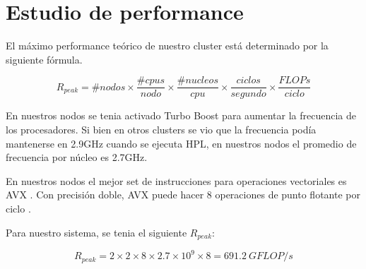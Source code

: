 
\section{Estudio de performance}

El máximo performance teórico de nuestro cluster está determinado por la siguiente fórmula. 

\begin{equation} \label{eq:1}
	R_{peak} = \#nodos \times \frac{\#cpus}{nodo} \times \frac{\#nucleos}{cpu} \times \frac{ciclos}{segundo} \times \frac{FLOPs}{ciclo} 
\end{equation}

En nuestros nodos se tenia activado Turbo Boost para aumentar la frecuencia de los procesadores. Si bien en otros clusters se vio que la frecuencia podía mantenerse en 2.9GHz cuando se ejecuta HPL, en nuestros nodos el promedio de frecuencia por núcleo es 2.7GHz.

En nuestros nodos el mejor set de instrucciones para operaciones vectoriales es AVX \cite{intel-avx}. Con precisión doble, AVX puede hacer 8 operaciones de punto flotante por ciclo \cite{wikichip-flops}.

Para nuestro sistema, se tenia el siguiente $R_{peak}$:

\begin{equation} \label{rpeak_two_node}
	R_{peak} = 2 \times 2 \times 8 \times 2.7 \times 10^{9} \times 8 = 691.2\ {GFLOP}/s
\end{equation}

